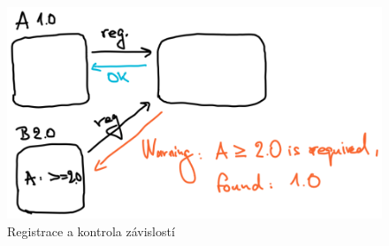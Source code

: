 \begin{figure}[htbp]
   \centering
   \includegraphics[max width=\textwidth]{assets/draft-version-reg}
   \caption{Registrace  a kontrola závislostí}\label{fig:version-reg}
\end{figure}

